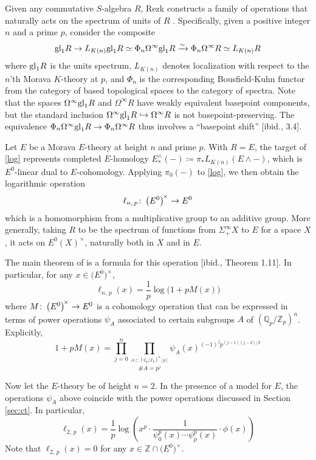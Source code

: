 \documentclass{gtpart}
\theoremstyle{definition}
\theoremstyle{remark}
\def\co{\colon\thinspace}
\newcommand{\mb}[1]{\mathbb{#1}}
\newcommand{\BQ}{{\mb Q}}
\newcommand{\BZ}{{\mb Z}}
\newcommand{\ce}{\coloneqq}
\renewcommand{\=}{\approx}
\renewcommand{\-}{\sim}
\newcommand{\gl}{{\rm gl}}
\numberwithin{equation}{section}
\numberwithin{thm}{section}
\begin{document}
Given any commutative $S$-algebra $R$, 
Rezk constructs a family of operations that naturally acts on the spectrum of units of $R$ \cite[Definition 3.6]{log}.  
Specifically, given a positive integer $n$ and a prime $p$, consider the composite 
\begin{equation}
 \label{log}
 \gl_1 R \to L_{K(n)} \gl_1 R \simeq \Phi_n \Omega^\infty \gl_1 R \xrightarrow{\sim} \Phi_n \Omega^\infty R \simeq L_{K(n)} R 
\end{equation}
where $\gl_1 R$ is the units spectrum, $L_{K(n)}$ denotes localization with respect to the $n$'th Morava $K$-theory at $p$, 
and $\Phi_n$ is the corresponding Bousfield-Kuhn functor from the category of based topological spaces to the category of spectra.  
Note that the spaces $\Omega^\infty \gl_1 R$ and $\Omega^\infty R$ have weakly equivalent basepoint components, 
but the standard inclusion $\Omega^\infty \gl_1 R \hookrightarrow \Omega^\infty R$ is not basepoint-preserving.  
The equivalence $\Phi_n \Omega^\infty \gl_1 R \to \Phi_n \Omega^\infty R$ thus involves a ``basepoint shift'' [ibid., 3.4].  

Let $E$ be a Morava $E$-theory at height $n$ and prime $p$.  
With $R = E$, the target of \eqref{log} represents completed $E$-homology 
$E^{\scriptscriptstyle \wedge}_*(-) \ce \pi_* L_{K(n)}(E \wedge -)$, 
which is $E^0$-linear dual to $E$-cohomology.  
Applying $\pi_0(-)$ to \eqref{log}, we then obtain the logarithmic operation 
\[
 \ell_{n,\,p} \co \big( E^0 \big)^{\!\times} \to E^0 
\]
which is a homomorphism from a multiplicative group to an additive group.  
More generally, taking $R$ to be the spectrum of functions from $\Sigma^\infty_+ X$ to $E$ for a space $X$, 
it acts on $E^0(X)^\times$, naturally both in $X$ and in $E$.  

The main theorem of \cite{log} is a formula for this operation [ibid., Theorem 1.11].  
In particular, for any $x \in \big( E^0 \big)^{\!\times}$, 
\[
 \ell_{n,\,p}(x) = \frac{1}{p} \log\big(1 + p M(x)\big) 
\]
where $M \co \big( E^0 \big)^{\!\times} \to E^0$ is a cohomology operation 
that can be expressed in terms of power operations $\psi_A$ associated to certain subgroups $A$ of $(\BQ_p/\BZ_p)^n$.  
Explicitly, 
\[
 1 + p M(x) = \prod_{j=0}^n \prod_{\stackrel{\scriptstyle A \subset (\BQ_p/\BZ_p)^n [p]}{\#A = p^j}} \psi_A(x)^{(-1)^j p^{(j-1)(j-2)/2}} 
\]

Now let the $E$-theory be of height $n = 2$.  
In the presence of a model for $E$, the operations $\psi_A$ above coincide with the power operations discussed in Section \ref{sec:ct}.  
In particular, 
\begin{equation}
 \label{l2p}
 \ell_{2,\,p}(x) = \frac{1}{p} \log \left( x^p \cdot \frac{1}{\psi^p_0(x) \cdots \psi^p_p(x)} \cdot \phi(x) \right) 
\end{equation}
Note that $\ell_{2,\,p}(x) = 0$ for any $x \in \BZ \cap \big( E^0 \big)^{\!\times}$.  
\end{document}
